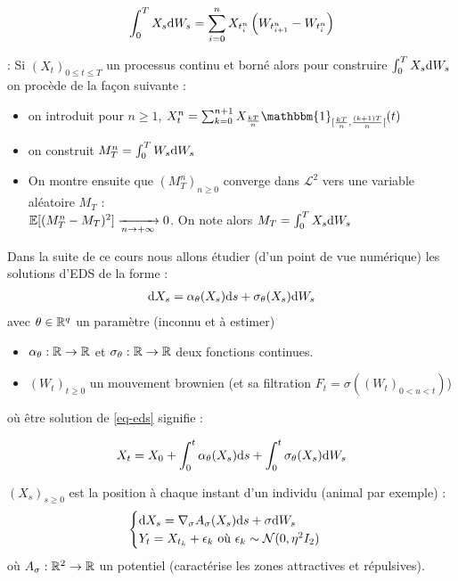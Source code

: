 \[ \int_{0}^{T} X_s \mathrm{d} W_s = \sum_{i=0}^{n} X_{t_i^n} \left(W_{t_{i+1}^n} - W_{t_i^n} \right) \]

 : Si $(X_t)_{0\leq t \leq T}$ un processus continu et borné alors pour construire $ \int_{0}^{T} X_s \mathrm{d} W_s$ on procède de la façon suivante :
\begin{itemize}
  \item on introduit pour $n \geq 1$, $X_t^n = \sum_{k=0}^{n+1} X_{ \frac{kT}{n}} \mathbbm{1}_{[ \frac{kT}{n}, \frac{(k+1)T}{n} [}(t)$
    \item on construit $M_T^n = \int_{0}^{T} W_s \mathrm{d} W_s$
    \item On montre ensuite que $(M_T^n)_{n\geq 0}$ converge dans $\mathcal{L}^2$ vers une variable aléatoire $M_T$ : \\
      $\mathbb{E}[(M_T^n - M_T)^2] \xrightarrow[n\to +\infty]{} 0$. On note alors $M_T = \int_{0}^{T} X_s \mathrm{d} W_s$
\end{itemize}

Dans la suite de ce cours nous allons étudier (d'un point de vue numérique) les solutions d'EDS de la forme :
\begin{equation*}
  \label{eq-eds}
\begin{split}
\mathrm{d} X_s = \alpha_\theta (X_s) \mathrm{d} s + \sigma_\theta (X_s) \mathrm{d} W_s 
\end{split}
\end{equation*}
avec $\theta \in \mathbb{R}^q$ un paramètre (inconnu et à estimer)
\begin{itemize}
\item $\alpha_\theta : \mathbb{R} \to \mathbb{R}$ et $\sigma_\theta : \mathbb{R} \to \mathbb{R}$ deux fonctions continues.
\item $(W_t)_{t\geq 0}$ un mouvement brownien (et sa filtration $F_t = \sigma((W_t)_{0 < u < t})$)
\end{itemize}
où être solution de \eqref{eq-eds} signifie :

\[ X_t = X_0 + \int_{0}^{t} \alpha_\theta(X_s) \mathrm{d} s + \int_{0}^{t} \sigma_\theta(X_s) \mathrm{d} W_s \]

\begin{ex}
  $(X_s)_{s \geq 0}$ est la position à chaque instant d'un individu (animal par exemple) :
  \[
    \begin{cases}
      \mathrm{d} X_s = \nabla_\sigma A_\sigma(X_s) \mathrm{d} s + \sigma \mathrm{d} W_s \\
      Y_t = X_{t_k} + \epsilon_k \text{ où } \epsilon_k \sim \mathcal{N}(0, \eta^2 I_2)
    \end{cases}
  \]
  où $A_\sigma : \mathbb{R}^2 \to \mathbb{R}$ un \og potentiel \fg{} (caractérise les zones attractives et répulsives).
\end{ex}

